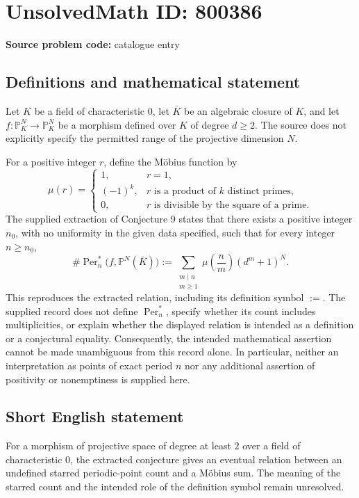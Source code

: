 \documentclass[11pt]{article}
\begin{document}
\section*{UnsolvedMath ID: 800386}
\textbf{Source problem code:} catalogue entry
\subsection{Definitions and mathematical statement}
Let \(K\) be a field of characteristic \(0\), let \(\bar K\) be an algebraic closure of \(K\), and let \(f:\mathbb P^N_K\to\mathbb P^N_K\) be a morphism defined over \(K\) of degree \(d\ge 2\). The source does not explicitly specify the permitted range of the projective dimension \(N\).

For a positive integer \(r\), define the M\"obius function by
\[
\mu(r)=\begin{cases}
1,&r=1,\\
(-1)^k,&r\text{ is a product of }k\text{ distinct primes},\\
0,&r\text{ is divisible by the square of a prime}.
\end{cases}
\]
The supplied extraction of Conjecture 9 states that there exists a positive integer \(n_0\), with no uniformity in the given data specified, such that for every integer \(n\ge n_0\),
\[
\#\operatorname{Per}_n^*\bigl(f,\mathbb P^N(\bar K)\bigr)
:=\sum_{\substack{m\mid n\\m\ge 1}}\mu\!\left(\frac{n}{m}\right)(d^m+1)^N.
\]
This reproduces the extracted relation, including its definition symbol \(:=\). The supplied record does not define \(\operatorname{Per}_n^*\), specify whether its count includes multiplicities, or explain whether the displayed relation is intended as a definition or a conjectural equality. Consequently, the intended mathematical assertion cannot be made unambiguous from this record alone. In particular, neither an interpretation as points of exact period \(n\) nor any additional assertion of positivity or nonemptiness is supplied here.
\subsection{Short English statement}
For a morphism of projective space of degree at least \(2\) over a field of characteristic \(0\), the extracted conjecture gives an eventual relation between an undefined starred periodic-point count and a M\"obius sum. The meaning of the starred count and the intended role of the definition symbol remain unresolved.
\end{document}
